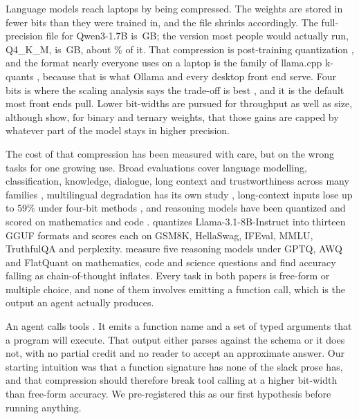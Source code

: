 \documentclass[10pt]{article}
\newcommand{\qm}{Qwen3-1.7B}
\begin{document}
Language models reach laptops by being compressed. The weights are stored in fewer bits than they were trained in, and the file shrinks accordingly. The full-precision file for \qm{} is \qtSizeFp{}\,GB; the version most people would actually run, Q4\_K\_M, is \qtSizeFour{}\,GB, about \qtCompressFour{}\% of it. That compression is post-training quantization \citep{dettmers2022int8,gptq2023,awq2024}, and the format nearly everyone uses on a laptop is the family of llama.cpp k-quants \citep{llamacpp}, because that is what Ollama and every desktop front end serve. Four bits is where the scaling analysis says the trade-off is best \citep{dettmers2023case,kumar2024precision}, and it is the default most front ends pull. Lower bit-widths are pursued for throughput as well as size, although \citet{malekar2025amdahl} show, for binary and ternary weights, that those gains are capped by whatever part of the model stays in higher precision.

The cost of that compression has been measured with care, but on the wrong tasks for one growing use. Broad evaluations cover language modelling, classification, knowledge, dialogue, long context and trustworthiness across many families \citep{jin2024comprehensive,li2024evaluating}, multilingual degradation has its own study \citep{marchisio2024multilingual}, long-context inputs lose up to 59\% under four-bit methods \citep{mekala2025longcontext}, and reasoning models have been quantized and scored on mathematics and code \citep{liu2025quanthurts}. \citet{kurt2026quant} quantizes Llama-3.1-8B-Instruct into thirteen GGUF formats and scores each on GSM8K, HellaSwag, IFEval, MMLU, TruthfulQA and perplexity. \citet{lotfi2026overthink} measure five reasoning models under GPTQ, AWQ and FlatQuant on mathematics, code and science questions and find accuracy falling as chain-of-thought inflates. Every task in both papers is free-form or multiple choice, and none of them involves emitting a function call, which is the output an agent actually produces.

An agent calls tools \citep{patil2023gorilla,qin2023toolllm,yao2024taubench}. It emits a function name and a set of typed arguments that a program will execute. That output either parses against the schema or it does not, with no partial credit and no reader to accept an approximate answer. Our starting intuition was that a function signature has none of the slack prose has, and that compression should therefore break tool calling at a higher bit-width than free-form accuracy. We pre-registered this as our first hypothesis before running anything.
\end{document}
